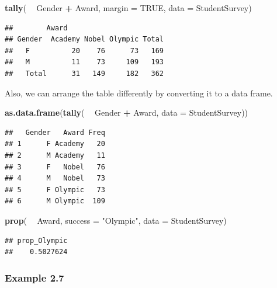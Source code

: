 \documentclass[]{book}
\newenvironment{Shaded}{\begin{snugshade}}{\end{snugshade}}
\newcommand{\DataTypeTok}[1]{\textcolor[rgb]{0.13,0.29,0.53}{#1}}
\newcommand{\KeywordTok}[1]{\textcolor[rgb]{0.13,0.29,0.53}{\textbf{#1}}}
\newcommand{\NormalTok}[1]{#1}
\newcommand{\OperatorTok}[1]{\textcolor[rgb]{0.81,0.36,0.00}{\textbf{#1}}}
\newcommand{\OtherTok}[1]{\textcolor[rgb]{0.56,0.35,0.01}{#1}}
\newcommand{\StringTok}[1]{\textcolor[rgb]{0.31,0.60,0.02}{#1}}
\begin{document}
\begin{Shaded}
\begin{Highlighting}[]
\KeywordTok{tally}\NormalTok{( }\OperatorTok{~}\StringTok{ }\NormalTok{Gender }\OperatorTok{+}\StringTok{ }\NormalTok{Award, }\DataTypeTok{margin =} \OtherTok{TRUE}\NormalTok{, }\DataTypeTok{data =}\NormalTok{ StudentSurvey)}
\end{Highlighting}
\end{Shaded}

\begin{verbatim}
##        Award
## Gender  Academy Nobel Olympic Total
##   F          20    76      73   169
##   M          11    73     109   193
##   Total      31   149     182   362
\end{verbatim}

Also, we can arrange the table differently by converting it to a data frame.

\begin{Shaded}
\begin{Highlighting}[]
\KeywordTok{as.data.frame}\NormalTok{(}\KeywordTok{tally}\NormalTok{( }\OperatorTok{~}\StringTok{ }\NormalTok{Gender }\OperatorTok{+}\StringTok{ }\NormalTok{Award, }\DataTypeTok{data =}\NormalTok{ StudentSurvey))}
\end{Highlighting}
\end{Shaded}

\begin{verbatim}
##   Gender   Award Freq
## 1      F Academy   20
## 2      M Academy   11
## 3      F   Nobel   76
## 4      M   Nobel   73
## 5      F Olympic   73
## 6      M Olympic  109
\end{verbatim}

\begin{Shaded}
\begin{Highlighting}[]
\KeywordTok{prop}\NormalTok{( }\OperatorTok{~}\StringTok{ }\NormalTok{Award, }\DataTypeTok{success =} \StringTok{"Olympic"}\NormalTok{, }\DataTypeTok{data =}\NormalTok{ StudentSurvey)}
\end{Highlighting}
\end{Shaded}

\begin{verbatim}
## prop_Olympic 
##    0.5027624
\end{verbatim}

\hypertarget{example-2.7}{%
\subsubsection{Example 2.7}\label{example-2.7}}
\end{document}
